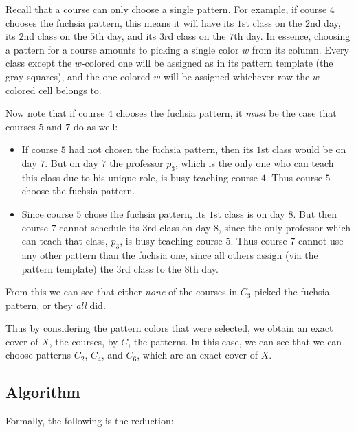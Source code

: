 Recall that a course can only choose a single pattern. For example, if course $4$ chooses the {\color{Fuchsia}fuchsia} pattern, this means it will have its $1$st class on the $2$nd day, its $2$nd class on the $5$th day, and its $3$rd class on the $7$th day. In essence, choosing a pattern for a course amounts to picking a single color $w$ from its column. Every class except the $w$-colored one will be assigned as in its pattern template (the {\color{gray}gray} squares), and the one colored $w$ will be assigned whichever row the $w$-colored cell belongs to.


Now note that if course $4$ chooses the {\color{Fuchsia}fuchsia} pattern, it \emph{must} be the case that courses $5$ and $7$ do as well:
\begin{itemize}
\item If course $5$ had not chosen the {\color{Fuchsia}fuchsia} pattern, then its $1$st class would be on day $7$. But on day $7$ the professor $p_3$, which is the only one who can teach this class due to his unique role, is busy teaching course $4$. Thus course $5$ choose the {\color{Fuchsia}fuchsia} pattern.
\item Since course $5$ chose the {\color{Fuchsia}fuchsia} pattern, its $1$st class is on day $8$. But then course $7$ cannot schedule its $3$rd class on day $8$, since the only professor which can teach that class, $p_3$, is busy teaching course $5$. Thus course $7$ cannot use any other pattern than the {\color{Fuchsia}fuchsia} one, since all others assign (via the pattern template) the $3$rd class to the $8$th day.
\end{itemize}

From this we can see that either \emph{none} of the courses in {\color{Fuchsia}$C_3$} picked the {\color{Fuchsia}fuchsia} pattern, or they \emph{all} did.

Thus by considering the pattern colors that were selected, we obtain an exact cover of $X$, the courses, by $C$, the patterns. In this case, we can see that we can choose patterns {\color{NavyBlue} $C_2$}, {\color{ForestGreen} $C_4$}, and {\color{Tan} $C_6$}, which are an exact cover of $X$.






\newpage
\subsection{Algorithm}
Formally, the following is the reduction:

